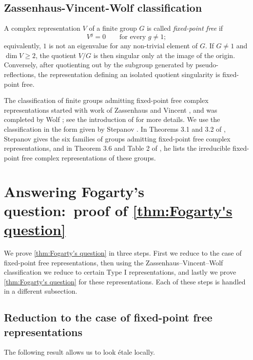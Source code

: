 \documentclass{amsart}
\theoremstyle{definition}
\begin{document}
\subsection{Zassenhaus-Vincent-Wolf classification}
A complex representation $V$ of a finite group $G$
is called \emph{fixed-point free} if
\[
 V^g=0\qquad\text{for every }g\neq1;
\]
equivalently, $1$ is not an eigenvalue for any non-trivial element of $G$. If $G\neq1$ and $\dim V\geq2$, the quotient $V/G$ is then singular only at the image of the origin.  Conversely, after quotienting out by the subgroup generated by pseudo-reflections, the representation
defining an isolated quotient singularity is fixed-point free.

The classification of finite groups admitting fixed-point free complex representations started with work of Zassenhaus \cite{Zassenhaus1935} and Vincent \cite{Vincent1947}, and was completed by Wolf \cite{Wolf2011}; see the introduction of \cite{Stepanov} for more details. We use the classification in the form given by Stepanov \cite[\S3]{Stepanov}. In Theorems 3.1 and 3.2 of \cite{Stepanov}, Stepanov gives the six families of groups admitting fixed-point free complex representations, and in Theorem 3.6 and Table 2 of \cite{Stepanov}, he lists the irreducible fixed-point free complex representations of these groups.




\section{Answering Fogarty's question:~proof of \autoref{thm:Fogarty's question}}

We prove \autoref{thm:Fogarty's question} in three steps. First we reduce to the case of fixed-point free representations, then using the Zassenhaus--Vincent--Wolf classification we reduce to certain Type I representations, and lastly we prove \autoref{thm:Fogarty's question} for these representations. Each of these steps is handled in a different subsection.


\subsection{Reduction to the case of fixed-point free representations}

The following result allows us to look \'etale locally.
\end{document}
